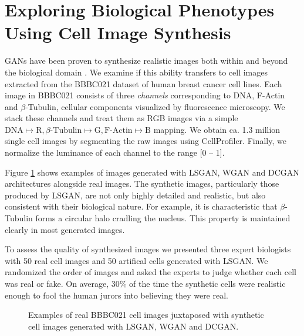 \documentclass{article}
\begin{document}
\section{Exploring Biological Phenotypes Using Cell Image Synthesis}\label{synthesis}
GANs have been proven to synthesize realistic images both within and beyond the biological domain \cite{goodfellow2014generative,radford2015unsupervised,osokin2017gans}. We examine if this ability transfers to cell images extracted from the BBBC021 dataset of human breast cancer cell lines. Each image in BBBC021 consists of three \emph{channels} corresponding to DNA, F-Actin and $\beta$-Tubulin, cellular components visualized by fluorescence microscopy. We stack these channels and treat them as RGB images via a simple $\text{DNA} \mapsto \text{R}, \text{$\beta$-Tubulin} \mapsto \text{G}, \text{F-Actin} \mapsto \text{B}$ mapping. We obtain ca. 1.3 million single cell images by segmenting the raw images using CellProfiler. Finally, we normalize the luminance of each channel to the range [0 -- 1].


Figure \ref{fig:generated} shows examples of images generated with LSGAN, WGAN
and DCGAN architectures alongside real images. The synthetic images,
particularly those produced by LSGAN, are not only highly detailed and
realistic, but also consistent with their biological nature. For example, it is
characteristic that $\beta$-Tubulin forms a circular halo cradling the nucleus.
This property is maintained clearly in most generated images.

To assess the quality of synthesized images we presented three expert biologists
with 50 real cell images and 50 artifical cells generated with LSGAN. We
randomized the order of images and asked the experts to judge whether each cell
was real or fake. On average, 30\% of the time the synthetic cells were
realistic enough to fool the human jurors into believing they were real.

\begin{figure}[b]
  \centering
  \caption{Examples of real BBBC021 cell images juxtaposed with synthetic cell images generated with LSGAN, WGAN and DCGAN.}
  \label{fig:generated}
\end{figure}
\end{document}
